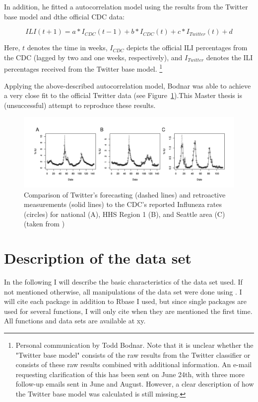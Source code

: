 \documentclass[11pt, a4paper]{report}\usepackage[]{graphicx}\usepackage[]{color}
\begin{document}
In addition, he fitted a autocorrelation model using the results from the Twitter base model and dthe official CDC data: 

$$ILI(t+1) = a*I_{CDC}(t-1) + b*I_{CDC}(t) + c*I_{Twitter}(t)+d$$

Here, $t$ denotes the time in weeks, $I_{CDC}$ depicts the official ILI percentages from the CDC (lagged by two and one weeks, respectively), and $I_{Twitter}$ denotes the ILI percentages received from the Twitter base model. \footnote{Personal communication by Todd Bodnar. Note that it is unclear whether the "Twitter base model" consists of the raw results from the Twitter classifier or consists of these raw results combined with additional information. An e-mail requesting clarification of this has been sent on June 24th, with three more follow-up emails sent in June and August. However, a clear description of how the Twitter base model was calculated is still missing.}\newline

Applying the above-described autocorrelation model, Bodnar was able to achieve a very close fit to the official Twitter data (see Figure~\ref{fig:cdc_fit_bodnar_thesis}).This Master thesis is (unsuccessful) attempt to reproduce these results. 

\begin{figure}[h]
  \centering
    \includegraphics[width=.9\textwidth]{cdc_fit_bodnar_thesis.png}
  \caption{Comparison of Twitter's forecasting (dashed lines) and retroactive measurements (solid lines) to the CDC's reported Influneza rates (circles) for national (A), HHS Region 1 (B), and Seattle area (C) (taken from \citep{bodnar_data_2015})}
  \label{fig:cdc_fit_bodnar_thesis}
  \end{figure}

\chapter{Description of the data set}
In the following I will describe the basic characteristics of the data set used. If not mentioned otherwise, all manipulations of the data set were done using . I will cite each package in addition to Rbase I used, but since single packages are used for several functions, I will only cite when they are mentioned the first time. All functions and data sets are available at xy.
\end{document}
